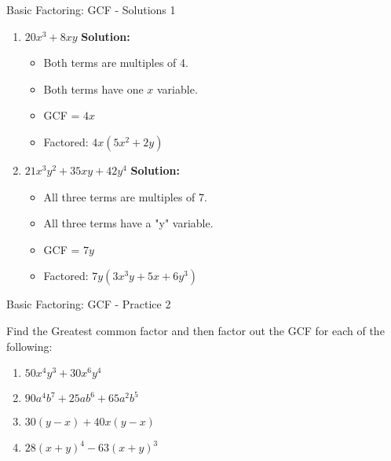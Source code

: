 \documentclass[aspectratio=169]{beamer}
\begin{document}
\begin{frame}{Basic Factoring: GCF - Solutions 1}
    \begin{tcolorbox}[colback=lightgray,colframe=accent,title=Detailed Solutions]
        \footnotesize
        \begin{enumerate}
            \setlength{\itemsep}{0.5em}
            \item $20x^3 + 8xy$
            \quad \textbf{Solution:}
            \begin{itemize}
                \item Both terms are multiples of 4.
                \item Both terms have one $x$ variable.
                \item GCF = $4x$
                \item Factored: $4x(5x^2 + 2y)$
            \end{itemize}
            \item $21x^3y^2 + 35xy + 42y^4$
            \quad \textbf{Solution:}
            \begin{itemize}
                \item All three terms are multiples of 7.
                \item All three terms have a "y" variable.
                \item GCF = $7y$
                \item Factored: $7y(3x^3y + 5x + 6y^3)$
            \end{itemize}
        \end{enumerate}
    \end{tcolorbox}
\end{frame}

\begin{frame}{Basic Factoring: GCF - Practice 2}
    \begin{tcolorbox}[colback=lightgray,colframe=primary,title=Practice Problems]
        \footnotesize
        Find the Greatest common factor and then factor out the GCF for each of the following:
        \begin{enumerate}
            \setlength{\itemsep}{0.5em}
            \item $50x^4y^3 + 30x^6y^4$
            \item $90a^4b^7 + 25ab^6 + 65a^2b^5$
            \item $30(y - x) + 40x(y - x)$
            \item $28(x + y)^4 - 63(x + y)^3$
        \end{enumerate}
    \end{tcolorbox}
\end{frame}
\end{document}
